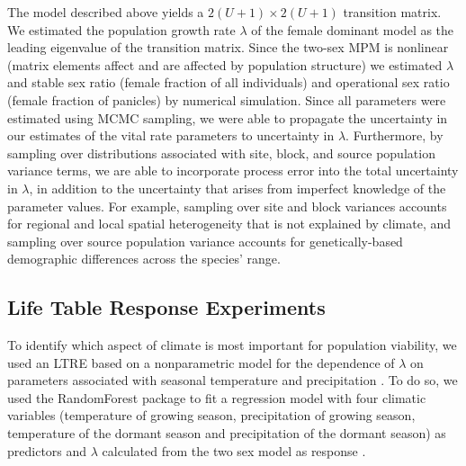 \documentclass[9pt,twocolumn,twoside,lineno]{pnas-new}
\newcommand{\jacob}[2]{{\color{blue}{#1}}\footnote{\textit{\color{blue}{#2}}}}
\begin{document}
The model described above yields a $2(U+1) \times 2(U+1)$ transition matrix. 
We estimated the population growth rate $\lambda$ of the female dominant model as the leading eigenvalue of the transition matrix. 
Since the two-sex MPM is nonlinear (matrix elements affect and are affected by population structure) we estimated $\lambda$ and stable sex ratio (female fraction of all individuals) and operational sex ratio (female fraction of panicles) by numerical simulation.
Since all parameters were estimated using MCMC sampling, we were able to propagate the uncertainty in our estimates of the vital rate parameters to uncertainty in $\lambda$. 
Furthermore, by sampling over distributions associated with site, block, and source population variance terms, we are able to incorporate process error into the total uncertainty in $\lambda$, in addition to the uncertainty that arises from imperfect knowledge of the parameter values. 
For example, sampling over site and block variances accounts for regional and local spatial heterogeneity that is not explained by climate, and sampling over source population variance accounts for genetically-based demographic differences across the species' range.


\subsection*{Life Table Response Experiments}
To identify which aspect of climate is most important for population viability, we used an LTRE based on a nonparametric model for the dependence of $\lambda$ on parameters associated with seasonal temperature and precipitation \citep{ellner2016data}. 
To do so, we used the RandomForest package to fit a regression model with four climatic variables (temperature of growing season, precipitation of growing season, temperature of the dormant season and precipitation of the dormant season) as predictors  and $\lambda$  calculated from the two sex model as response \citep{liaw2002classification}.
\end{document}
